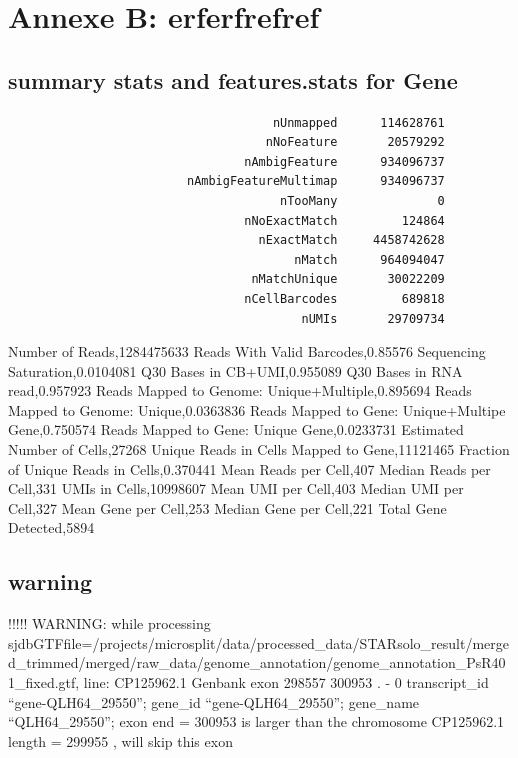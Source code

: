 \documentclass[
  11pt,
  a4paper,
]{report}
\begin{document}
\chapter{Annexe B: erferfrefref}\label{annexe-b}

\section{summary stats and features.stats for
Gene}\label{summary-stats-and-features.stats-for-gene}

\begin{verbatim}
                                     nUnmapped      114628761
                                    nNoFeature       20579292
                                 nAmbigFeature      934096737
                         nAmbigFeatureMultimap      934096737
                                      nTooMany              0
                                 nNoExactMatch         124864
                                   nExactMatch     4458742628
                                        nMatch      964094047
                                  nMatchUnique       30022209
                                 nCellBarcodes         689818
                                         nUMIs       29709734
\end{verbatim}

Number of Reads,1284475633 Reads With Valid Barcodes,0.85576 Sequencing
Saturation,0.0104081 Q30 Bases in CB+UMI,0.955089 Q30 Bases in RNA
read,0.957923 Reads Mapped to Genome: Unique+Multiple,0.895694 Reads
Mapped to Genome: Unique,0.0363836 Reads Mapped to Gene: Unique+Multipe
Gene,0.750574 Reads Mapped to Gene: Unique Gene,0.0233731 Estimated
Number of Cells,27268 Unique Reads in Cells Mapped to Gene,11121465
Fraction of Unique Reads in Cells,0.370441 Mean Reads per Cell,407
Median Reads per Cell,331 UMIs in Cells,10998607 Mean UMI per Cell,403
Median UMI per Cell,327 Mean Gene per Cell,253 Median Gene per Cell,221
Total Gene Detected,5894

\section{warning}\label{warning-2}

!!!!! WARNING: while processing
sjdbGTFfile=/projects/microsplit/data/processed\_data/STARsolo\_result/merged\_trimmed/merged/raw\_data/genome\_annotation/genome\_annotation\_PsR401\_fixed.gtf,
line: CP125962.1 Genbank exon 298557 300953 . - 0 transcript\_id
``gene-QLH64\_29550''; gene\_id ``gene-QLH64\_29550''; gene\_name
``QLH64\_29550''; exon end = 300953 is larger than the chromosome
CP125962.1 length = 299955 , will skip this exon
\end{document}
